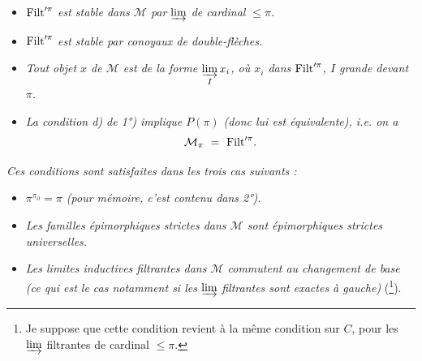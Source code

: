 \dgrchunkbegin

\clearpage

\setcounter{footnote}{49}


\begin{itemize}
\item[\textit{1)}] $\mathrm{Filt}'^{\pi}$ \textit{est stable dans $\mathcal{M}$ par} $\varinjlim$ \textit{de cardinal $\leqslant \pi$.}
\item[\textit{1$'$)}] $\mathrm{Filt}'^{\pi}$ \textit{est stable par conoyaux de double-flèches.}
\item[\textit{2)}] \textit{Tout objet $x$ de $\mathcal{M}$ est de la forme $\varinjlim\limits_{I} x_i$, où $x_i$ dans} $\mathrm{Filt}'^{\pi}$\textit{, $I$ grande devant $\pi$.}
\item[\textit{3)}] \textit{La condition d) de 1°) implique $P(\pi)$ (donc lui est équivalente), i.e. on a}
\[ \mathcal{M}_{\pi} \ = \ \Filt'^{\pi}. \]
\end{itemize}

\textit{Ces conditions sont satisfaites dans les trois cas suivants :}
\begin{itemize}
\item[\textit{A)}] \textit{$\pi^{\pi_0} = \pi$ (pour mémoire, c'est contenu dans 2°).}
\item[\textit{B)}] \textit{Les familles épimorphiques strictes dans $\mathcal{M}$ sont épimorphiques strictes universelles.}
\item[\textit{C)}] \textit{Les limites inductives filtrantes dans $\mathcal{M}$ commutent au changement de base (ce qui est le cas notamment si les} $\varinjlim$ \textit{filtrantes sont exactes à gauche)} (\footnote{Je suppose que cette condition revient à la même condition sur $C$, pour les $\varinjlim$ filtrantes de cardinal $\leqslant \pi$.}).
\end{itemize}

